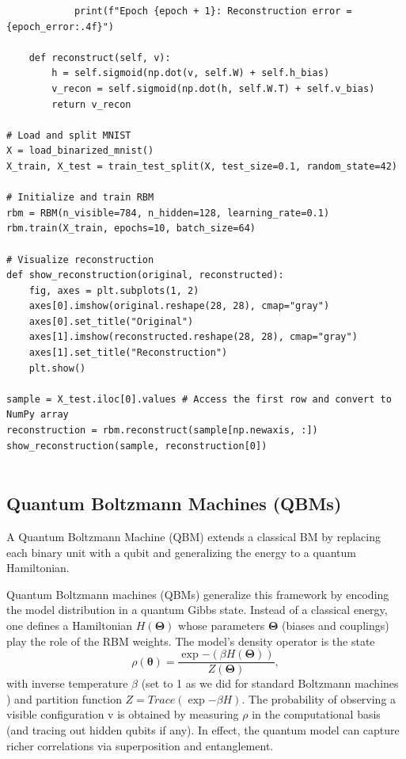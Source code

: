 \documentclass[%
oneside,                 %
final,                   %
10pt]{article}
\begin{document}
\begin{verbatim}
            print(f"Epoch {epoch + 1}: Reconstruction error = {epoch_error:.4f}")

    def reconstruct(self, v):
        h = self.sigmoid(np.dot(v, self.W) + self.h_bias)
        v_recon = self.sigmoid(np.dot(h, self.W.T) + self.v_bias)
        return v_recon

# Load and split MNIST
X = load_binarized_mnist()
X_train, X_test = train_test_split(X, test_size=0.1, random_state=42)

# Initialize and train RBM
rbm = RBM(n_visible=784, n_hidden=128, learning_rate=0.1)
rbm.train(X_train, epochs=10, batch_size=64)

# Visualize reconstruction
def show_reconstruction(original, reconstructed):
    fig, axes = plt.subplots(1, 2)
    axes[0].imshow(original.reshape(28, 28), cmap="gray")
    axes[0].set_title("Original")
    axes[1].imshow(reconstructed.reshape(28, 28), cmap="gray")
    axes[1].set_title("Reconstruction")
    plt.show()

sample = X_test.iloc[0].values # Access the first row and convert to NumPy array
reconstruction = rbm.reconstruct(sample[np.newaxis, :])
show_reconstruction(sample, reconstruction[0])


\end{verbatim}


\subsection*{Quantum Boltzmann Machines (QBMs)}

A Quantum Boltzmann Machine (QBM) extends a classical BM by replacing
each binary unit with a qubit and generalizing the energy to a quantum
Hamiltonian.

Quantum Boltzmann machines (QBMs) generalize this framework by
encoding the model distribution in a quantum Gibbs state.  Instead of
a classical energy, one defines a Hamiltonian $H(\boldsymbol{\Theta})$
whose parameters $\boldsymbol{\Theta}$ (biases and couplings) play the
role of the RBM weights.  The model’s density operator is the state
\[
\rho(\boldsymbol{\theta}) = \frac{\exp{-(\beta H(\boldsymbol{\Theta}))}}{Z(\boldsymbol{\Theta})},
\]
with inverse temperature $\beta$ (set to 1 as we did for standard Boltzmann machines ) and partition function
$Z = Trace(\exp{-\beta H})$.  The probability of observing a visible
configuration v is obtained by measuring $\rho$ in the computational
basis (and tracing out hidden qubits if any).  In effect, the quantum
model can capture richer correlations via superposition and
entanglement.
\end{document}
